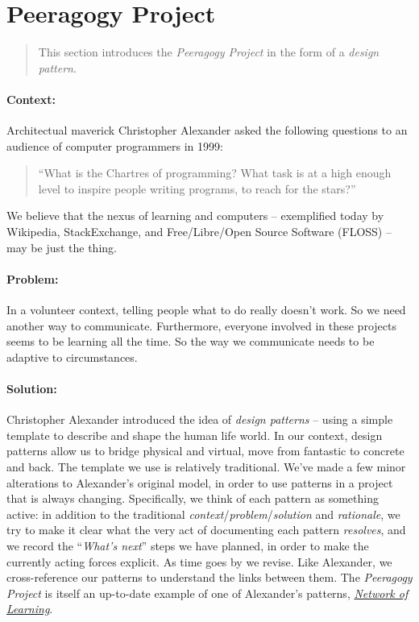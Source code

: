 \section{Peeragogy Project}

\begin{quote}
This section introduces the \emph{Peeragogy Project} in the form of a \emph{design pattern}.
\end{quote}

\paragraph{Context:}  Architectual maverick Christopher Alexander asked the following questions to an audience of computer programmers in 1999: 
\begin{quote}
``What is the Chartres of programming? What task is at a high enough level to inspire people writing programs, to reach for the stars?''
\end{quote}
We believe that the nexus of learning and computers -- exemplified today by Wikipedia, StackExchange, and Free/Libre/Open Source Software (FLOSS) -- may be just the thing.

\paragraph{Problem:} In a volunteer context, telling people what to do really doesn't work.  So we need another way to communicate.  Furthermore, everyone involved in these projects seems to be learning all the time.  So the way we communicate needs to be adaptive to circumstances.

\paragraph{Solution:} Christopher Alexander introduced the idea of \emph{design patterns} -- using a simple template to describe and shape the human life world.  In our context, design patterns allow us to bridge physical and virtual, move from fantastic to concrete and back.  The template we use is relatively traditional.  We've made a few minor alterations to Alexander's original model, in order to use patterns in a project that is always changing.  Specifically, we think of each pattern as something active: in addition to the traditional \emph{context}/\emph{problem}/\emph{solution} and \emph{rationale}, we try to make it clear what the very act of documenting each pattern \emph{resolves}, and we record the ``\emph{What's next}'' steps we have planned, in order to make the currently acting forces explicit.  As time goes by we revise.  Like Alexander, we cross-reference our patterns to understand the links between them.  The \emph{Peeragogy Project} is itself an up-to-date example of one of Alexander's patterns, \href{http://en.wikipedia.org/wiki/Networked_learning#1970s}{\emph{Network of Learning}}.

